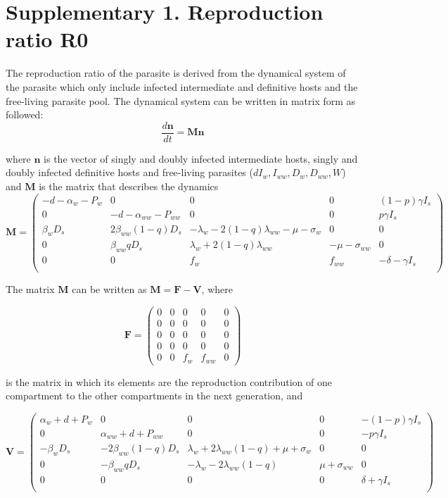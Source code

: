 \documentclass[11pt]{article}
\begin{document}
\section*{Supplementary 1. Reproduction ratio R0}

The reproduction ratio of the parasite is derived from the dynamical system of the parasite which only include infected intermediate and definitive hosts and the free-living parasite pool. The dynamical system can be written in matrix form as followed:
\[
\frac{d \mathbf{n}}{dt} = \mathbf{M} \mathbf{n}
\]

where $\mathbf{n}$ is the vector of singly and doubly infected intermediate hosts, singly and doubly infected definitive hosts and free-living parasites ($dI_w, I_{ww}, D_w, D_{ww}, W$) and $\mathbf{M}$ is the matrix that describes the dynamics
\[ \mathbf{M} = 
\begin{pmatrix}
- d - \alpha_w - P_w & 0 & 0 & 0 & (1 - p) \gamma I_s \\
0 & -d - \alpha_{ww} - P_{ww} & 0 & 0 & p \gamma I_s \\
\beta_w D_s & 2 \beta_{ww} (1-q) D_s &-\lambda_w - 2  (1-q)\lambda_{ww}  -\mu -\sigma_w & 0 & 0 \\
0 & \beta_{ww} q D_s  & \lambda_w + 2 (1-q) \lambda_{ww}  & -\mu - \sigma_{ww} & 0 \\
 0 & 0 & f_w & f_{ww} &- \delta - \gamma I_s  \\
\end{pmatrix}
\]

The matrix $\mathbf{M}$ can be written as $\mathbf{M} = \mathbf{F} - \mathbf{V}$, where

\[
\mathbf{F} = 
\begin{pmatrix}
0 & 0 & 0 & 0 & 0  \\
0 & 0 & 0 & 0 & 0  \\
0 & 0 & 0 & 0 & 0  \\
0 & 0 & 0 & 0 & 0  \\
0 & 0 & f_w & f_{ww} & 0
\end{pmatrix}
\]

is the matrix in which its elements are the reproduction contribution of one compartment to the other compartments in the next generation, and

\[
\mathbf{V} = 
\begin{pmatrix}
\alpha_w + d + P_w  & 0 & 0 & 0 & - (1 - p) \gamma  I_s\\
 0 & \alpha_{ww} + d + P_{ww} & 0 & 0 & - p \gamma I_s \\
- \beta_w D_s & -2 \beta_{ww}  (1 - q) D_s & \lambda_w + 2 \lambda_{ww} (1-q) + \mu + \sigma_w & 0 & 0 \\
 0 & -\beta_{ww} q D_s  & -\lambda_w - 2 \lambda_{ww} (1 - q) & \mu + \sigma_{ww} & 0 \\
 0 & 0 & 0 & 0 & \delta + \gamma I_s \\
\end{pmatrix}
\]
\end{document}
